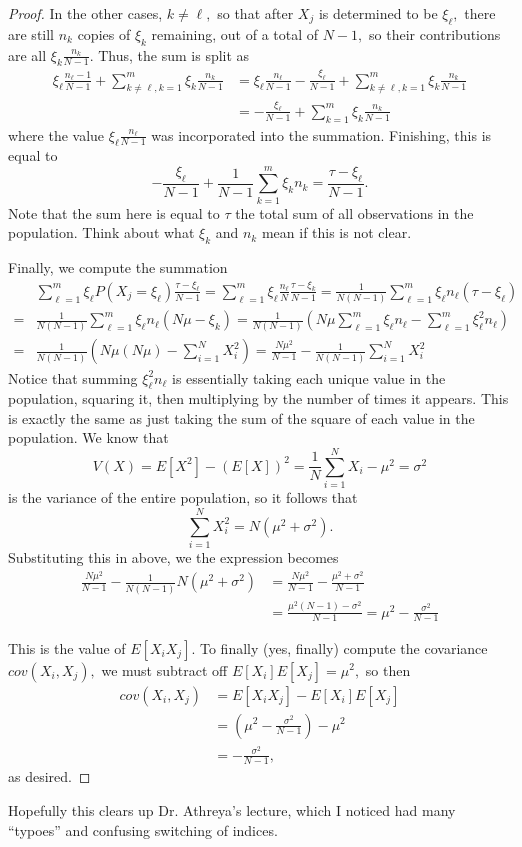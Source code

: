 \documentclass{article}
\begin{document}
\begin{proof}
	In the other cases, $k\neq\ell,$ so that after $X_j$ is determined to be $\xi_\ell,$ there are still $n_k$ copies of $\xi_k$ remaining, out of a total of $N-1,$ so their contributions are all $\xi_k\frac{n_k}{N-1}.$ Thus, the sum is split as 
	\begin{align*}
		\xi_\ell\frac{n_\ell-1}{N-1}+\sum_{k\neq\ell, k=1}^m \xi_k\frac{n_k}{N-1}&=\xi_\ell\frac{n_\ell}{N-1}-\frac{\xi_\ell}{N-1}+\sum_{k\neq\ell, k=1}^m \xi_k\frac{n_k}{N-1} \\
		&= -\frac{\xi_\ell}{N-1}+\sum_{k=1}^m \xi_k\frac{n_k}{N-1}
	\end{align*} where the value $\xi_\ell\frac{n_\ell}{N-1}$ was incorporated into the summation. Finishing, this is equal to \[-\frac{\xi_\ell}{N-1}+\frac{1}{N-1}\sum_{k=1}^m \xi_k n_k=\frac{\tau-\xi_\ell}{N-1}.\] Note that the sum here is equal to $\tau$ the total sum of all observations in the population. Think about what $\xi_k$ and $n_k$ mean if this is not clear.

	Finally, we compute the summation
\begin{align*}
&\sum_{\ell=1}^m \xi_\ell P(X_j=\xi_\ell)\frac{\tau-\xi_\ell}{N-1} = \sum_{\ell=1}^m \xi_\ell \frac{n_\ell}{N}\frac{\tau-\xi_k}{N-1}=\frac{1}{N(N-1)}\sum_{\ell=1}^m \xi_\ell n_\ell (\tau-\xi_\ell) \\
= &\frac{1}{N(N-1)}\sum_{\ell=1}^m\xi_\ell n_\ell (N\mu-\xi_k) = \frac{1}{N(N-1)}\left( N\mu\sum_{\ell=1}^m \xi_\ell n_\ell - \sum_{\ell=1}^m \xi_\ell^2 n_\ell \right) \\
= &\frac{1}{N(N-1)}\left( N\mu(N\mu) - \sum_{i=1}^N X_i^2\right) = \frac{N\mu^2}{N-1} - \frac{1}{N(N-1)}\sum_{i=1}^N X_i^2
\end{align*}
Notice that summing $\xi_\ell^2 n_\ell$ is essentially taking each unique value in the population, squaring it, then multiplying by the number of times it appears. This is exactly the same as just taking the sum of the square of each value in the population. We know that \[V(X)=E[X^2]-(E[X])^2=\frac{1}{N}\sum_{i=1}^N X_i - \mu^2 = \sigma^2 \] is the variance of the entire population, so it follows that \[\sum_{i=1}^N X_i^2 = N(\mu^2+\sigma^2).\] Substituting this in above, we the expression becomes 
\begin{align*}
	\frac{N\mu^2}{N-1} - \frac{1}{N(N-1)}N(\mu^2+\sigma^2) &= \frac{N\mu^2}{N-1} - \frac{\mu^2+\sigma^2}{N-1} \\
	&= \frac{\mu^2(N-1) - \sigma^2}{N-1} = \mu^2 - \frac{\sigma^2}{N-1}
\end{align*}

This is the value of $E[X_iX_j].$ To finally (yes, finally) compute the covariance $cov(X_i, X_j),$ we must subtract off $E[X_i]E[X_j]=\mu^2,$ so then 
\begin{align*}
	cov(X_i, X_j) &= E[X_iX_j]-E[X_i]E[X_j] \\
	&= \left( \mu^2-\frac{\sigma^2}{N-1} \right) - \mu^2 \\
	&= -\frac{\sigma^2}{N-1},
\end{align*} as desired.
\end{proof}

Hopefully this clears up Dr. Athreya's lecture, which I noticed had many ``typoes'' and confusing switching of indices. 


\newpage
\end{document}

